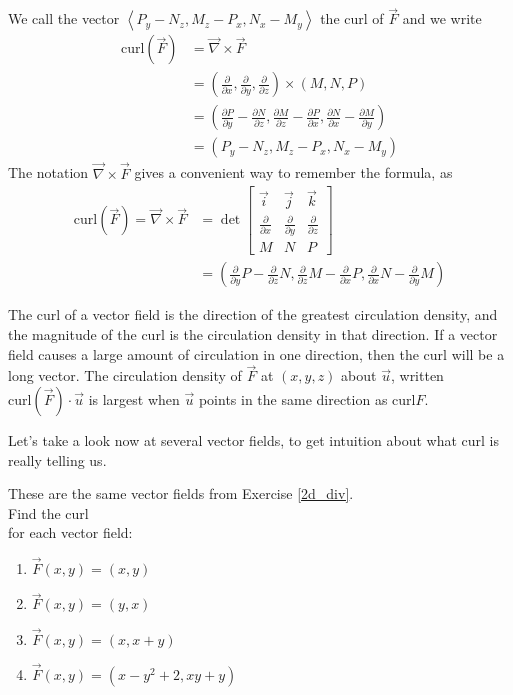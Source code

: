 We call the vector $\left<P_y-N_z,M_z-P_x,N_x-M_y\right>$ the curl of $\vec F$ and we write 
\begin{align*}
\text{curl}(\vec F) 
&= \vec \nabla \times \vec F \\
&= \left(\frac{\partial}{\partial x},\frac{\partial}{\partial y},\frac{\partial}{\partial z}\right) \times (M,N,P) \\
&= \left(\frac{\partial P}{\partial y}-\frac{\partial N}{\partial z}, \frac{\partial M}{\partial z}-\frac{\partial P}{\partial x},\frac{\partial N}{\partial x}-\frac{\partial M}{\partial y}\right) \\
&=  \left(P_y-N_z,M_z-P_x,N_x-M_y\right) 
\end{align*}
  The notation $\vec \nabla \times \vec F $ gives a convenient way to remember the formula, as 
\begin{align*}
\text{curl}(\vec F)=\vec \nabla \times \vec F 
&=\det \begin{bmatrix}
\vec i & \vec j & \vec k\\
\frac{\partial}{\partial x}&\frac{\partial}{\partial y}&\frac{\partial}{\partial z}\\
M&N&P
\end{bmatrix} 
\\&= \left(\frac{\partial}{\partial y}P-\frac{\partial}{\partial z}N,\frac{\partial}{\partial z}M-\frac{\partial}{\partial x}P,\frac{\partial}{\partial x}N-\frac{\partial}{\partial y}M\right)
\end{align*}
\begin{theorem}
The curl of a vector field is the direction of the greatest circulation density, and the magnitude of the curl is the circulation density in that direction. If a vector field causes a large amount of circulation in one direction, then the curl will be a long vector. The circulation density of $\vec F$ at $(x,y,z)$ about $\vec u$, written $\text{curl}(\vec F)\cdot \vec u$ is largest when $\vec u$ points in the same direction as $\text{curl} F$. 
\end{theorem}

Let's take a look now at several vector fields, to get intuition about what curl is really telling us.
\begin{problem}\label{2dcurl}
These are the same vector fields from Exercise \ref{2d_div}.\\
Find the curl\\  for each vector field:
\begin{enumerate}
\item $\vec{F}(x,y)=(x,y)$
\item $\vec{F}(x,y)=(y,x)$
\item $\vec{F}(x,y)=(x,x+y)$
\item $\vec{F}(x,y)=(x-y^2+2, xy+y)$
\end{enumerate}
\end{problem}

